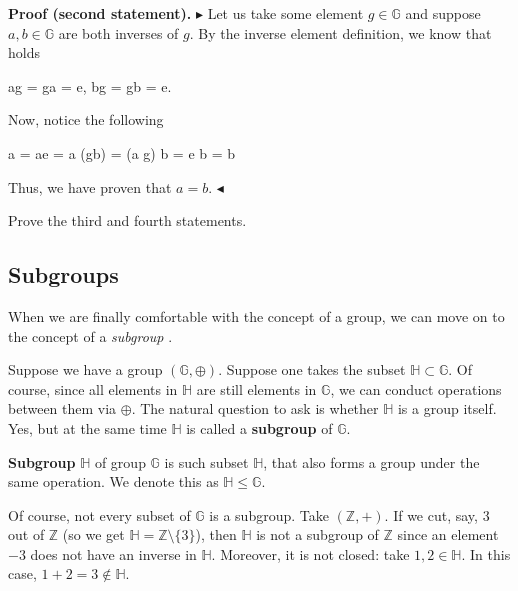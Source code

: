 \documentclass[../lecture-notes-148x210.tex]{subfiles}
\begin{document}
\textbf{Proof (second statement).} 
$\blacktriangleright$ 
Let us take some element $g \in \mathbb{G}$ and suppose $a, b \in \mathbb{G}$ are both inverses of $g$. 
By the inverse element definition, we know that holds
\begin{xequation}
    ag = ga = e, \quad bg = gb = e.
\end{xequation}
Now, notice the following 
\begin{xequation}
    a = ae = a (gb) = (a g) b = e b = b
\end{xequation}
Thus, we have proven that $a = b$.
$\blacktriangleleft$

\begin{exercise}
    Prove the third and fourth statements.
\end{exercise}

\subsection{Subgroups}

When we are finally comfortable with the concept of a group, we can move on to the concept of a \textit{subgroup} \cite[section 3]{Judson_2012}. 

Suppose we have a group $(\mathbb{G},\oplus)$. Suppose one takes the subset 
$\mathbb{H} \subset \mathbb{G}$. Of course, since all elements in $\mathbb{H}$ are still 
elements in $\mathbb{G}$, we can conduct operations between them via $\oplus$. 
The natural question to ask is whether $\mathbb{H}$ is a group itself. Yes, but at the same 
time $\mathbb{H}$ is called a \textbf{subgroup} of $\mathbb{G}$.

\begin{definition}
    \textbf{Subgroup} $\mathbb{H}$ of group $\mathbb{G}$ is such subset $\mathbb{H}$, that 
    also forms a group under the same operation.
    We denote this as $\mathbb{H} \leq \mathbb{G}$.
\end{definition}

\begin{example}
    Of course, not every subset of $\mathbb{G}$ is a subgroup. Take $(\mathbb{Z}, +)$. If we cut, say, $3$ out of 
    $\mathbb{Z}$ (so we get $\mathbb{H} = \mathbb{Z} \setminus \{3\}$), then $\mathbb{H}$ is not a subgroup of 
    $\mathbb{Z}$ since an element $-3$ does not have an inverse in $\mathbb{H}$. Moreover, it is not closed: 
    take $1,2 \in \mathbb{H}$. In this case, $1+2 = 3 \notin \mathbb{H}$.
\end{example}
\end{document}
